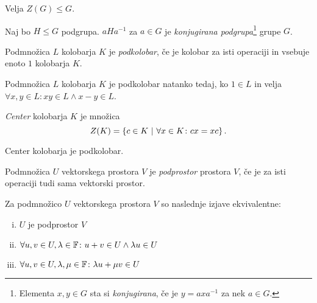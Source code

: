 \begin{opomba}
Velja $Z(G) \leq G$.
\end{opomba}

\begin{definicija}
Naj bo $H \leq G$ podgrupa. $aHa^{-1}$ za $a \in G$ je \emph{konjugirana podgrupa}\footnote{Elementa $x,y \in G$ sta si \emph{konjugirana}, če je $y=axa^{-1}$ za nek $a \in G$.} grupe $G$.
\end{definicija}

\begin{definicija}
Podmnožica $L$ kolobarja $K$ je \emph{podkolobar}, če je kolobar za isti operaciji in vsebuje enoto $1$ kolobarja $K$.
\end{definicija}

\begin{trditev}
Podmnožica $L$ kolobarja $K$ je podkolobar natanko tedaj, ko $1 \in L$ in velja $\forall x,y \in L \colon xy \in L \land x-y \in L$.
\end{trditev}

\obvs

\begin{definicija}
\emph{Center} kolobarja $K$ je množica
\[
Z(K) = \left\{c \in K~\middle\vert~\forall x \in K \colon cx = xc\right\}.
\]
\end{definicija}

\begin{opomba}
Center kolobarja je podkolobar.
\end{opomba}

\begin{definicija}
Podmnožica $U$ vektorskega prostora $V$ je \emph{podprostor} prostora $V$, če je za isti operaciji tudi sama vektorski prostor.
\end{definicija}

\begin{trditev}
Za podmnožico $U$ vektorskega prostora $V$ so naslednje izjave ekvivalentne:

\begin{enumerate}[i)]
\item $U$ je podprostor $V$
\item $\forall u,v \in U, \lambda \in \mathbb{F} \colon u+v \in U \land \lambda u \in U$
\item $\forall u,v \in U, \lambda, \mu \in \mathbb{F} \colon \lambda u + \mu v \in U$
\end{enumerate}
\end{trditev}

